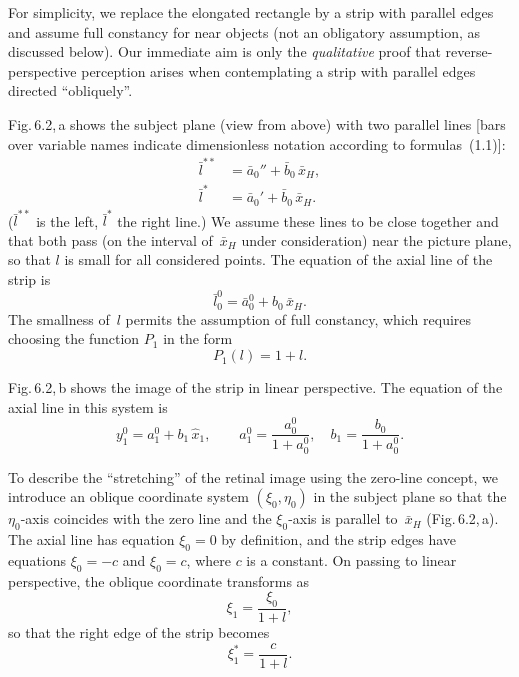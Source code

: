 For simplicity, we replace the elongated rectangle by a strip with parallel edges and
assume full constancy for near objects (not an obligatory assumption, as discussed below).
Our immediate aim is only the \emph{qualitative} proof that reverse-perspective perception
arises when contemplating a strip with parallel edges directed ``obliquely''.

Fig.\,6.2,\,a shows the subject plane (view from above) with two parallel lines [bars
over variable names indicate dimensionless notation according to formulas~(1.1)]:
\begin{align}
  \bar{l}^{**} &= \bar{a}_0'' + \bar{b}_0\,\bar{x}_H,  \tag{6.1a}\\
  \bar{l}^{*} &= \bar{a}_0' + \bar{b}_0\,\bar{x}_H.   \tag{6.1b}
\end{align}
($\bar{l}^{**}$ is the left, $\bar{l}^*$ the right line.)  We assume these lines to be
close together and that both pass (on the interval of~$\bar{x}_H$ under consideration)
near the picture plane, so that $l$ is small for all considered points.  The equation of
the axial line of the strip is
\begin{equation}
  \bar{l}_0^0 = \bar{a}_0^0 + b_0\,\bar{x}_H.  \tag{6.2}
\end{equation}
The smallness of~$l$ permits the assumption of full constancy, which requires choosing the
function $P_1$ in the form
\begin{equation}
  P_1(l) = 1 + l.  \tag{6.3}
\end{equation}


Fig.\,6.2,\,b shows the image of the strip in linear perspective.  The equation of the
axial line in this system is
\begin{equation}
  y_1^0 = a_1^0 + b_1\,\hat{x}_1, \qquad
  a_1^0 = \frac{a_0^0}{1+a_0^0},\quad b_1 = \frac{b_0}{1+a_0^0}.  \tag{6.4}
\end{equation}

To describe the ``stretching'' of the retinal image using the zero-line concept, we
introduce an oblique coordinate system $(\xi_0, \eta_0)$ in the subject plane so that the
$\eta_0$-axis coincides with the zero line and the $\xi_0$-axis is parallel to~$\bar{x}_H$
(Fig.\,6.2,\,a).  The axial line has equation $\xi_0 = 0$ by definition, and the strip
edges have equations $\xi_0 = -c$ and $\xi_0 = c$, where $c$ is a constant.  On passing
to linear perspective, the oblique coordinate transforms as
\begin{equation}
  \xi_1 = \frac{\xi_0}{1 + l},  \tag{6.5}
\end{equation}
so that the right edge of the strip becomes
\begin{equation}
  \xi_1^* = \frac{c}{1+l}.  \tag{6.6}
\end{equation}

